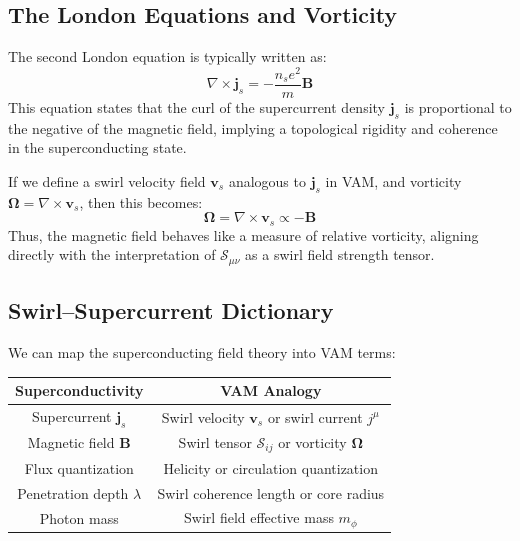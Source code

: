 \documentclass[a4paper,12pt]{article}
\begin{document}
        \subsection*{The London Equations and Vorticity}
        The second London equation is typically written as:
        \begin{equation}
            \nabla \times \mathbf{j}_s = -\frac{n_s e^2}{m} \mathbf{B}
        \end{equation}
        This equation states that the curl of the supercurrent density $\mathbf{j}_s$ is proportional to the negative of the magnetic field, implying a topological rigidity and coherence in the superconducting state.

        If we define a swirl velocity field $\mathbf{v}_s$ analogous to $\mathbf{j}_s$ in VAM, and vorticity $\boldsymbol{\Omega} = \nabla \times \mathbf{v}_s$, then this becomes:
        \begin{equation}
            \boldsymbol{\Omega} = \nabla \times \mathbf{v}_s \propto -\mathbf{B}
        \end{equation}
        Thus, the magnetic field behaves like a measure of relative vorticity, aligning directly with the interpretation of $\mathcal{S}_{\mu\nu}$ as a swirl field strength tensor.

        \subsection{Swirl–Supercurrent Dictionary}
        We can map the superconducting field theory into VAM terms:
        \begin{center}
            \begin{tabular}{|c|c|}
                \hline
                \textbf{Superconductivity} & \textbf{VAM Analogy} \\
                \hline
                Supercurrent $\mathbf{j}_s$ & Swirl velocity $\mathbf{v}_s$ or swirl current $j^\mu$ \\
                Magnetic field $\mathbf{B}$ & Swirl tensor $\mathcal{S}_{ij}$ or vorticity $\boldsymbol{\Omega}$ \\
                Flux quantization & Helicity or circulation quantization \\
                Penetration depth $\lambda$ & Swirl coherence length or core radius \\
                Photon mass & Swirl field effective mass $m_\phi$ \\
                \hline
            \end{tabular}
        \end{center}
\end{document}
